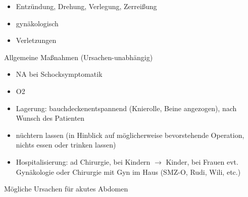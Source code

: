 \documentclass{article}
\begin{document}
\begin{itemize}
\item Entz\"undung, Drehung, Verlegung, Zerrei{\ss}ung

\item gyn\"akologisch

\item Verletzungen

\end{itemize}
Allgemeine Ma{\ss}nahmen (Ursachen-unabh\"angig)

\begin{itemize}
\item NA  bei Schocksymptomatik

\item O2

\item Lagerung: bauchdeckenentspannend  (Knierolle, Beine  angezogen),
nach Wunsch des Patienten

\item n\"uchtern lassen (in Hinblick auf m\"oglicherweise bevorstehende
Operation, nichts essen oder trinken lassen)

\item Hospitalisierung: ad Chirurgie, bei Kindern ${\rightarrow}$
Kinder, bei Frauen evt. Gyn\"akologie oder Chirurgie mit Gyn im Haus
(SMZ-O, Rudi, Wili, etc.)

\end{itemize}
M\"ogliche Ursachen f\"ur akutes Abdomen
\end{document}
